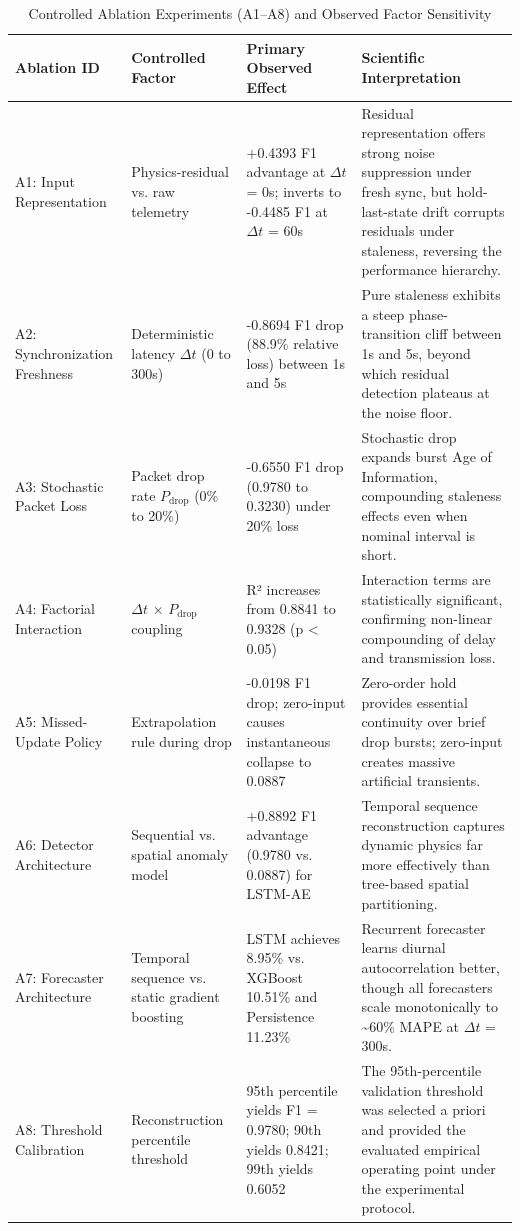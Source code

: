 \begin{table}[htbp]
\centering
\caption{Controlled Ablation Experiments (A1--A8) and Observed Factor Sensitivity}
\label{tab:ablation_summary}
\small
\begin{tabular}{p{2.6cm}p{3.0cm}p{3.2cm}p{6.8cm}}
\hline
\textbf{Ablation ID} & \textbf{Controlled Factor} & \textbf{Primary Observed Effect} & \textbf{Scientific Interpretation} \\
\hline
A1: Input Representation & Physics-residual vs. raw telemetry & +0.4393 F1 advantage at $\Delta t$ = 0s; inverts to -0.4485 F1 at $\Delta t$ = 60s & Residual representation offers strong noise suppression under fresh sync, but hold-last-state drift corrupts residuals under staleness, reversing the performance hierarchy. \\
\hline
A2: Synchronization Freshness & Deterministic latency $\Delta t$ (0 to 300s) & -0.8694 F1 drop (88.9\% relative loss) between 1s and 5s & Pure staleness exhibits a steep phase-transition cliff between 1s and 5s, beyond which residual detection plateaus at the noise floor. \\
\hline
A3: Stochastic Packet Loss & Packet drop rate $P_{\text{drop}}$ (0\% to 20\%) & -0.6550 F1 drop (0.9780 to 0.3230) under 20\% loss & Stochastic drop expands burst Age of Information, compounding staleness effects even when nominal interval is short. \\
\hline
A4: Factorial Interaction & $\Delta t$ × $P_{\text{drop}}$ coupling & R² increases from 0.8841 to 0.9328 (p < 0.05) & Interaction terms are statistically significant, confirming non-linear compounding of delay and transmission loss. \\
\hline
A5: Missed-Update Policy & Extrapolation rule during drop & -0.0198 F1 drop; zero-input causes instantaneous collapse to 0.0887 & Zero-order hold provides essential continuity over brief drop bursts; zero-input creates massive artificial transients. \\
\hline
A6: Detector Architecture & Sequential vs. spatial anomaly model & +0.8892 F1 advantage (0.9780 vs. 0.0887) for LSTM-AE & Temporal sequence reconstruction captures dynamic physics far more effectively than tree-based spatial partitioning. \\
\hline
A7: Forecaster Architecture & Temporal sequence vs. static gradient boosting & LSTM achieves 8.95\% vs. XGBoost 10.51\% and Persistence 11.23\% & Recurrent forecaster learns diurnal autocorrelation better, though all forecasters scale monotonically to \textasciitilde{}60\% MAPE at $\Delta t$ = 300s. \\
\hline
A8: Threshold Calibration & Reconstruction percentile threshold & 95th percentile yields F1 = 0.9780; 90th yields 0.8421; 99th yields 0.6052 & The 95th-percentile validation threshold was selected a priori and provided the evaluated empirical operating point under the experimental protocol. \\
\hline
\end{tabular}
\end{table}
